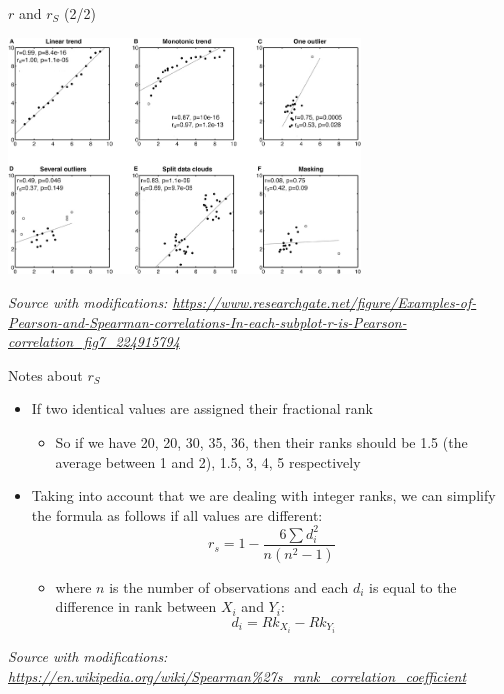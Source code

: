 \documentclass{beamer}
\begin{document}
\begin{frame}
{\centerline{$r$ and $r_S$ (2/2)}}

\begin{center}
\includegraphics[width=0.7\textwidth]{P2023.AIBCCSS.InferenceAndLogisticRegression/Examples-of-Pearson-and-Spearman-correlations-In-each-subplot-r-is-Pearson-correlation.jpeg}
\end{center} 

\textit{\tiny
\vspace{-\baselineskip}
Source with modifications: \url{https://www.researchgate.net/figure/Examples-of-Pearson-and-Spearman-correlations-In-each-subplot-r-is-Pearson-correlation_fig7_224915794}}

\end{frame}

\begin{frame}
{\centerline{Notes about  $r_S$}}
\begin{itemize}
   \item If two identical values are assigned their fractional rank
   \begin{itemize}
   \item So if we have 20, 20, 30, 35, 36, then their ranks should be 1.5 (the average between 1 and 2), 1.5, 3, 4, 5 respectively
\end{itemize}
   \item Taking into account that we are dealing with integer ranks, we can simplify the formula as follows if all values are different:
   $$ r_{s}={1-{\frac {6\sum d_{i}^{2}}{n(n^{2}-1)}}}$$
   \begin{itemize}
   \item where $n$ is the number of observations and each $d_i$ is equal to the difference in rank between $X_i$ and $Y_i$:
   $$d_i = Rk_{X_i} - Rk_{Y_i}$$
\end{itemize}
\end{itemize}

\textit{\tiny
\vspace{-\baselineskip}
Source with modifications: \url{https://en.wikipedia.org/wiki/Spearman\%27s_rank_correlation_coefficient}}

\end{frame}
\end{document}
